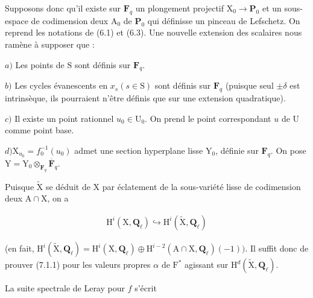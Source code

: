 \documentclass[10pt,leqno]{article}
\begin{document}
\noindent Supposons donc qu’il existe sur \(\mathbf{F}_{q}\) un plongement projectif \(\mathrm{X}_{0}\longrightarrow \mathbf{P}_{0}\) et un sous-espace de codimension deux \(\mathrm{A}_{0}\) de \(\mathbf{P}_{0}\) qui définisse un pinceau de Lefschetz. On reprend les notations de (6.1) et (6.3). Une nouvelle extension des scalaires nous ramène à supposer que :\par

\noindent \(a)\) Les points de \(\mathrm{S}\) sont définis sur \(\mathbf{F}_{q}\).\par

\noindent \(b)\) Les cycles évanescents en \(x_{s} (s\in \mathrm{S})\) sont définis sur \(\mathbf{F}_{q}\) (puisque seul \(\pm \delta \) est intrinsèque, ils pourraient n’être définis que sur une extension quadratique).\par

\noindent \(c)\) Il existe un point rationnel \(u_{0}\in \mathrm{U}_{0}\). On prend le point correspondant \(u\) de \(\mathrm{U}\) comme point base.\par

\noindent \(d) \mathrm{X}_{u_{0}}=f_{0}^{- 1}(u_{0})\) admet une section hyperplane lisse \(\mathrm{Y}_{0}\), définie sur \(\mathbf{F}_{q}\). On pose \(\mathrm{Y}=\mathrm{Y}_{0}\otimes _{\mathbf{F}_{q}}\overline{\mathbf{F}}_{q}\).\par

\noindent Puisque \(\widetilde{\mathrm{X}}\) se déduit de \(\mathrm{X}\) par éclatement de la sous-variété lisse de codimension deux \(\mathrm{A}\cap \mathrm{X}\), on a\par

\begin{equation*}\begin{gathered}\mathrm{H}^{i}(\mathrm{X},\mathbf{Q}_{\ell }) \hookrightarrow  \mathrm{H}^{i}(\widetilde{\mathrm{X}},\mathbf{Q}_{\ell })\end{gathered}\end{equation*}

\noindent (en fait, \(\mathrm{H}^{i}(\widetilde{\mathrm{X}},\mathbf{Q}_{\ell })=\mathrm{H}^{i}(\mathrm{X},\mathbf{Q}_{\ell })\oplus \mathrm{H}^{i- 2}(\mathrm{A}\cap \mathrm{X},\mathbf{Q}_{\ell })(- 1))\). Il suffit donc de prouver (7.1.1) pour les valeurs propres \(\alpha \) de \(\mathrm{F}^{*}\) agissant sur \(\mathrm{H}^{d}(\widetilde{\mathrm{X}},\mathbf{Q}_{\ell })\).\par

\noindent La suite spectrale de Leray pour \(f\) s’écrit\par
\end{document}
